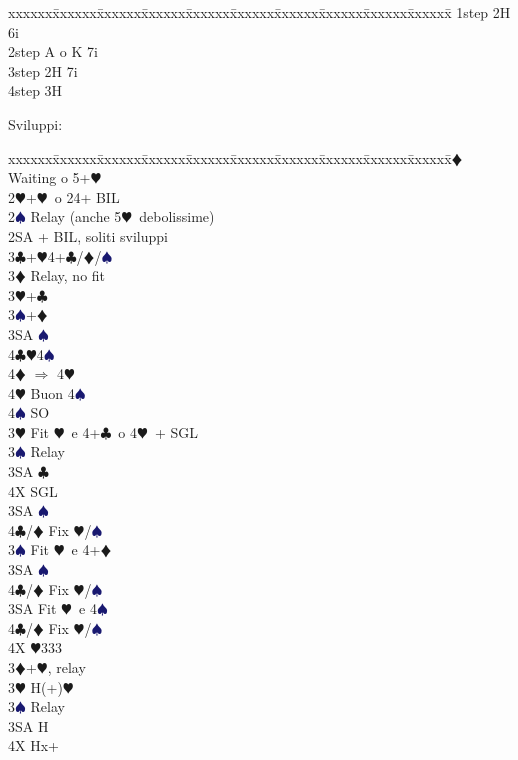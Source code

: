 \documentclass[a4paper,italian]{article}
\newcommand{\BC}{\textcolor{OliveGreen}{$\clubsuit$}}
\newcommand{\BD}{\textcolor{RedOrange}{$\vardiamondsuit$}}
\newcommand{\BH}{\textcolor{Red2}{$\varheartsuit${}}}
\newcommand{\BS}{\textcolor{MidnightBlue}{$\spadesuit${}}}
\newenvironment{bidtable}
{\begin{tabbing}

    xxxxxx\=xxxxxx\=xxxxxx\=xxxxxx\=xxxxxx\=xxxxxx\=xxxxxx\=xxxxxx\=xxxxxx\=xxxxxx\=\kill}
{\end{tabbing} }%
\newenvironment{varie}[1]
{\begin{tcolorbox}[colframe=green!40!black,title=#1]}
    {
\end{tcolorbox} }%
\begin{document}
\begin{multicols}{2}
\begin{varie}{(*) Relay richiesta onori}
        \begin{bidtable}
            1step \> 2H 6i\\
            2step \> A o K 7i\\
            3step \> 2H 7i\\
            4step \> 3H
        \end{bidtable}
    \end{varie}
    Sviluppi:
    \begin{bidtable}
        2\BD \> Waiting o 5+\BH \+\\
        2\BH {}+\BH\ o 24+ BIL\+\\
        2\BS \> Relay (anche 5\BH\ debolissime)\+\\
        2SA + BIL, soliti sviluppi\\
        3\BC {}+\BH4+\BC/\BD/\BS \+\\
        3\BD \> Relay, no fit\+\\
        3\BH {}+\BC \\
        3\BS {}+\BD \\
        3SA \BS \\
        4\BC {}\BH 4\BS \+\\
        4\BD \> $\Rightarrow$ 4\BH\\
        4\BH \> Buon 4\BS \\
        4\BS \> SO\-\-\\
        3\BH \> Fit \BH\ e 4+\BC\ o 4\BH\ + SGL\+\\
        3\BS \> Relay\+\\
        3SA \BC \\
        4X \> SGL\-\\
        3SA \BS \+\\
        4\BC/\BD \> Fix \BH/\BS\-\-\\
        3\BS \> Fit \BH\ e 4+\BD \+\\
        3SA \BS \+\\
        4\BC/\BD \> Fix \BH/\BS\-\-\\
        3SA \> Fit \BH\ e 4\BS \+\\
        4\BC/\BD \> Fix \BH/\BS\-\\
        4X \BH 333\-\\
        3\BD {}+\BH , relay\+\\
        3\BH \> H(+)\BH \+\\
        3\BS \> Relay\+\\
        3SA \> H\\
        4X \> Hx+\-\-\\

\end{bidtable}
\end{multicols}
\end{document}
